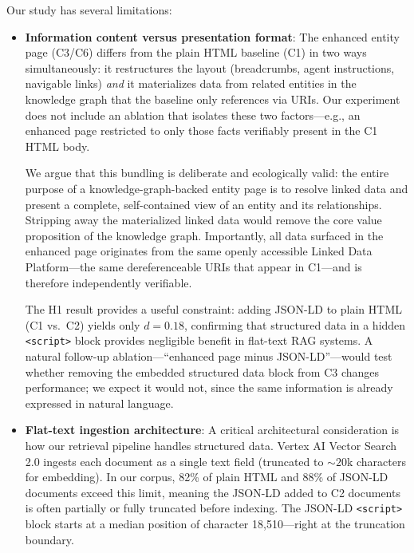 \documentclass[runningheads]{llncs}
\begin{document}
Our study has several limitations:
\begin{itemize}
    \item \textbf{Information content versus presentation format}:
          The enhanced entity page (C3/C6) differs from the plain HTML
          baseline (C1) in two ways simultaneously: it restructures
          the layout (breadcrumbs, agent instructions, navigable links)
          \emph{and} it materializes data from related entities in the
          knowledge graph that the baseline only references via URIs.
          Our experiment does not include an ablation that isolates
          these two factors---e.g., an enhanced page restricted to
          only those facts verifiably present in the C1 HTML body.

          \medskip

          We argue that this bundling is deliberate and ecologically
          valid: the entire purpose of a knowledge-graph-backed entity
          page is to resolve linked data and present a complete,
          self-contained view of an entity and its relationships.
          Stripping away the materialized linked data would remove the
          core value proposition of the knowledge graph.  Importantly,
          all data surfaced in the enhanced page originates from the
          same openly accessible Linked Data Platform---the same
          dereferenceable URIs that appear in C1---and is therefore
          independently verifiable.

          \medskip

          The H1 result provides a useful constraint: adding JSON-LD
          to plain HTML (C1 vs.\ C2) yields only $d = 0.18$,
          confirming that structured data in a hidden
          \texttt{\textless script\textgreater} block provides
          negligible benefit in flat-text RAG systems.  A natural
          follow-up ablation---``enhanced page minus JSON-LD''---would
          test whether removing the embedded structured data block
          from C3 changes performance; we expect it would not,
          since the same information is already expressed in natural
          language.

    \item \textbf{Flat-text ingestion architecture}: A critical
          architectural consideration is how our retrieval pipeline
          handles structured data. Vertex AI Vector Search 2.0 ingests
          each document as a single text field (truncated to ${\sim}20$k
          characters for embedding). In our corpus, 82\% of plain HTML
          and 88\% of JSON-LD documents exceed this limit, meaning the
          JSON-LD added to C2 documents is often partially or fully
          truncated before indexing. The JSON-LD \texttt{\textless script\textgreater}
          block starts at a median position of character 18,510---right at
          the truncation boundary.


\end{itemize}
\end{document}
